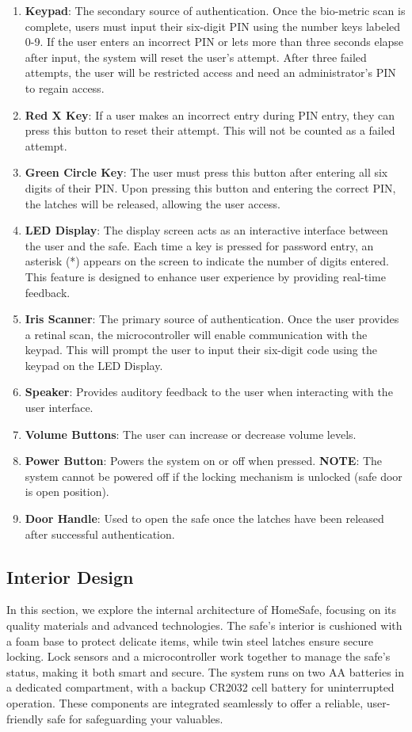 \documentclass{article}
\begin{document}
\begin{enumerate}
    \item \textbf{Keypad}: The secondary source of authentication. Once the bio-metric scan is complete, users must input their six-digit PIN using the number keys labeled 0-9. If the user enters an incorrect PIN or lets more than three seconds elapse after input, the system will reset the user's attempt. After three failed attempts, the user will be restricted access and need an administrator's PIN to regain access.
    \item \textbf{Red X Key}: If a user makes an incorrect entry during PIN entry, they can press this button to reset their attempt. This will not be counted as a failed attempt.
    \item \textbf{Green Circle Key}: The user must press this button after entering all six digits of their PIN. Upon pressing this button and entering the correct PIN, the latches will be released, allowing the user access.
    \item \textbf{LED Display}: The display screen acts as an interactive interface between the user and the safe. Each time a key is pressed for password entry, an asterisk (*) appears on the screen to indicate the number of digits entered. This feature is designed to enhance user experience by providing real-time feedback.
    \item \textbf{Iris Scanner}: The primary source of authentication. Once the user provides a retinal scan, the microcontroller will enable communication with the keypad. This will prompt the user to input their six-digit code using the keypad on the LED Display.
    \item \textbf{Speaker}: Provides auditory feedback to the user when interacting with the user interface.
    \item \textbf{Volume Buttons}: The user can increase or decrease volume levels.
    \item \textbf{Power Button}: Powers the system on or off when pressed. \textbf{NOTE}: The system cannot be powered off if the locking mechanism is unlocked (safe door is open position).
    \item \textbf{Door Handle}: Used to open the safe once the latches have been released after successful authentication.
\end{enumerate}

\subsection{Interior Design}
In this section, we explore the internal architecture of HomeSafe, focusing on its quality materials and advanced technologies. The safe's interior is cushioned with a foam base to protect delicate items, while twin steel latches ensure secure locking. Lock sensors and a microcontroller work together to manage the safe's status, making it both smart and secure. The system runs on two AA batteries in a dedicated compartment, with a backup CR2032 cell battery for uninterrupted operation. These components are integrated seamlessly to offer a reliable, user-friendly safe for safeguarding your valuables.
\end{document}
